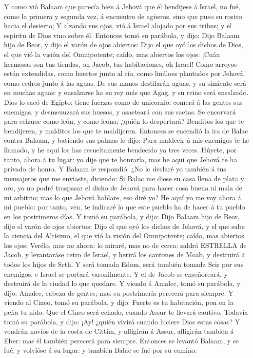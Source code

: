  Y como vió Balaam que parecía bien á Jehová que él
bendijese á Israel, no fué, como la primera y segunda vez, á encuentro
de agüeros, sino que puso su rostro hacia el desierto;  Y
alzando sus ojos, vió á Israel alojado por sus tribus; y el espíritu de
Dios vino sobre él.  Entonces tomó su parábola, y dijo:
Dijo Balaam hijo de Beor, y dijo el varón de ojos abiertos:
 Dijo el que oyó los dichos de Dios, el que vió la visión
del Omnipotente; caído, mas abiertos los ojos:  ¡Cuán
hermosas son tus tiendas, oh Jacob, tus habitaciones, oh Israel!
 Como arroyos están extendidas, como huertos junto al río,
como lináloes plantados por Jehová, como cedros junto á las aguas.
 De sus manos destilarán aguas, y su simiente será en
muchas aguas: y ensalzarse ha su rey más que Agag, y su reino será
ensalzado.  Dios lo sacó de Egipto; tiene fuerzas como de
unicornio: comerá á las gentes sus enemigas, y desmenuzará sus huesos, y
asaeteará con sus saetas.  Se encorvará para echarse como
león, y como leona; ¿quién lo despertará? Benditos los que te
bendijeren, y malditos los que te maldijeren.  Entonces
se encendió la ira de Balac contra Balaam, y batiendo sus palmas le
dijo: Para maldecir á mis enemigos te he llamado, y he aquí los has
resueltamente bendecido ya tres veces.  Húyete, por
tanto, ahora á tu lugar: yo dije que te honraría, mas he aquí que Jehová
te ha privado de honra.  Y Balaam le respondió: ¿No lo
declaré yo también á tus mensajeros que me enviaste, diciendo:
 Si Balac me diese su casa llena de plata y oro, yo no
podré traspasar el dicho de Jehová para hacer cosa buena ni mala de mi
arbitrio; mas lo que Jehová hablare, eso diré yo?  He
aquí yo me voy ahora á mi pueblo: por tanto, ven, te indicaré lo que
este pueblo ha de hacer á tu pueblo en los postrimeros días.
 Y tomó su parábola, y dijo: Dijo Balaam hijo de Beor,
dijo el varón de ojos abiertos:  Dijo el que oyó los
dichos de Jehová, y el que sabe la ciencia del Altísimo, el que vió la
visión del Omnipotente; caído, mas abiertos los ojos: 
Verélo, mas no ahora: lo miraré, mas no de cerca: saldrá ESTRELLA de
Jacob, y levantaráse cetro de Israel, y herirá los cantones de Moab, y
destruirá á todos los hijos de Seth.  Y será tomada Edom,
será también tomada Seir por sus enemigos, e Israel se portará
varonilmente.  Y el de Jacob se enseñoreará, y destruirá
de la ciudad lo que quedare.  Y viendo á Amalec, tomó su
parábola, y dijo: Amalec, cabeza de gentes; mas su postrimería perecerá
para siempre.  Y viendo al Cineo, tomó su parábola, y
dijo: Fuerte es tu habitación, pon en la peña tu nido: 
Que el Cineo será echado, cuando Assur te llevará cautivo.
 Todavía tomó su parábola, y dijo: ¡Ay! ¿quién vivirá
cuando hiciere Dios estas cosas?  Y vendrán navíos de la
costa de Cittim, y afligirán á Assur, afligirán también á Eber: mas él
también perecerá para siempre.  Entonces se levantó
Balaam, y se fué, y volvióse á su lugar: y también Balac se fué por su
camino.

